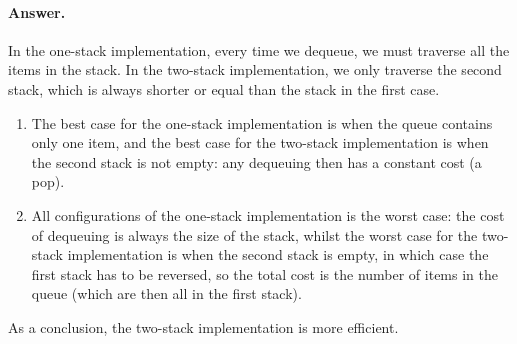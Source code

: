 \paragraph{Answer.} In the one-stack implementation, every time
we dequeue, we must traverse all the items in the stack. In the
two-stack implementation, we only traverse the second stack, which is
always shorter or equal than the stack in the first case.
\begin{enumerate}

  \item The best case for the one-stack implementation is when the
    queue contains only one item, and the best case for the two-stack
    implementation is when the second stack is not empty: any
    dequeuing then has a constant cost (a pop).

  \item All configurations of the one-stack implementation is the
    worst case: the cost of dequeuing is always the size of the stack,
    whilst the worst case for the two-stack implementation is when the
    second stack is empty, in which case the first stack has to be
    reversed, so the total cost is the number of items in the queue
    (which are then all in the first stack).

\end{enumerate}
As a conclusion, the two-stack implementation is more efficient.

